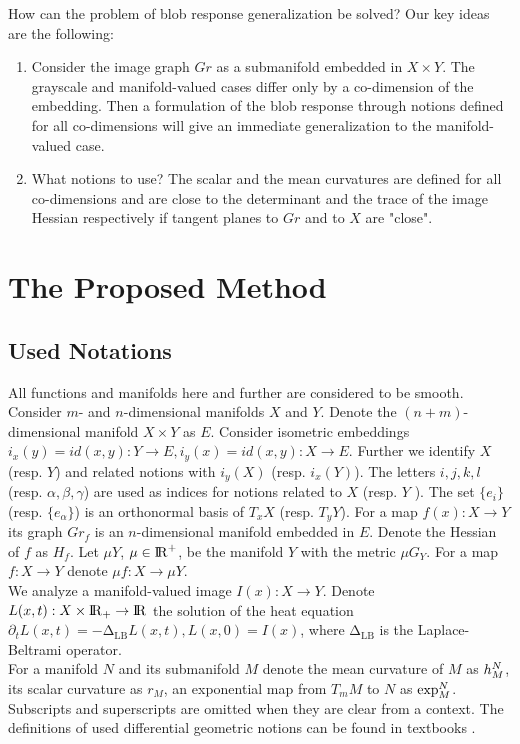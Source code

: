 \documentclass{llncs}
\newcommand{\LaplaceBeltrami}{\mathrm{\Delta_{{LB}}}}
\newcommand{\partderiv}[2]{\partial_{#2} {#1}}
\newcommand{\toreal}{\rightarrow\bbbr}
\newcommand{\TangentSpaceArg}[2]{{T_{#2}}{#1}}
\begin{document}
How can the problem of blob response generalization be solved? Our key ideas are the following:

\begin{enumerate}
\item	Consider the image graph $Gr$ as a submanifold embedded in $X\times Y$. The grayscale and manifold-valued cases differ only by a co-dimension of the embedding. Then a formulation of the blob response through notions defined for all co-dimensions will give an immediate generalization to the manifold-valued case. 
\item	What notions to use? The scalar and the mean curvatures are defined for all co-dimensions and are close to the determinant and the trace of the image Hessian respectively if tangent planes to $Gr$ and to $X$ are "close".
\end{enumerate}

\section{The Proposed Method}
\subsection{Used Notations}
All functions and manifolds here and further are considered to be smooth. Consider $m$- and $n$-dimensional manifolds $X$ and $Y$. Denote the $(n+m)$-dimensional manifold $X\times Y$ as $E$. Consider isometric embeddings $i_x(y)=id(x, y):Y\to E, i_y(x)=id(x, y):X\to E$. Further we identify $X$ (resp. $Y$) and related notions with $i_y(X)$ (resp. $i_x(Y)$). The letters $i,j,k,l$ (resp. $\alpha, \beta, \gamma$) are used as indices for notions related to $X$ (resp. $Y$ ). The set $\{e_i\}$ (resp. $\{e_\alpha\}$) is an orthonormal basis of $T_x X$ (resp. $T_y Y$). For a map $f(x):X\to Y$ its graph $Gr_f$ is an $n$-dimensional manifold embedded in $E$. Denote the Hessian of $f$ as $H_f$. Let $\mu Y$, $\mu \in {\rm I\!R}^{+}$, be the manifold $Y$ with the metric $\mu G_Y$. For a map $f:X\to Y$ denote $\mu f:X\to \mu Y$.
\\
We analyze a manifold-valued image $I(x):X \to Y$. Denote $L(x,t):X\times \bbbr_{+} \toreal$ the solution of the heat equation $\partderiv{L(x, t)}{t}=-\LaplaceBeltrami{ L(x, t)},L(x, 0)=I(x)$, where $\LaplaceBeltrami$ is the Laplace-Beltrami operator. 
\\
For a manifold $N$ and its submanifold $M$ denote the mean curvature of $M$ as $\tensor*{h}{^{N}_{M}}$, its scalar curvature as $r_M$, an exponential map from $\TangentSpaceArg{M}{m}$ to $N$ as $\tensor*{\exp}{^N_{M}}$.
\\
Subscripts and superscripts are omitted when they are clear from a context. The definitions of used differential geometric notions can be found in textbooks \cite{DiffGeom}.
\end{document}
